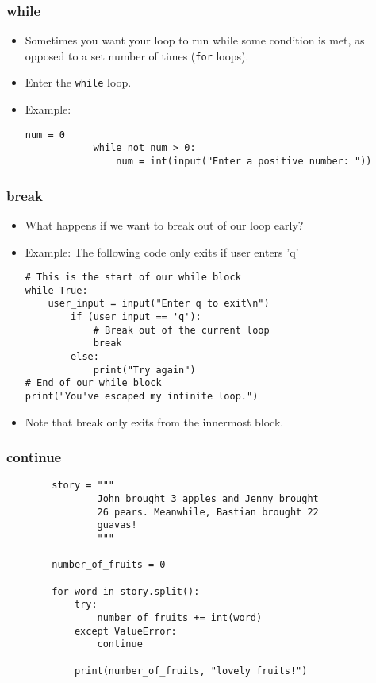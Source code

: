 \documentclass[notes]{beamer}
\begin{document}
	\begin{frame}[fragile]
		\frametitle{while}
		\begin{itemize}
			\item Sometimes you want your loop to run while some condition is met, as opposed to a set number of times (\lstinline|for| loops).
			\item Enter the \lstinline|while| loop.
			\pause
			\item Example:
			\begin{lstlisting}[xleftmargin=\dimexpr-\leftmargini, basicstyle=\scriptsize\tt]
			num = 0
			while not num > 0:
			    num = int(input("Enter a positive number: "))
			\end{lstlisting}

		\end{itemize}
	\end{frame}
	
	\begin{frame}[fragile]
		\frametitle{break}
		\begin{itemize}
			\item What happens if we want to break out of our loop early?
			\item Example:
			The following code only exits if user enters 'q'
			\begin{lstlisting}[xleftmargin=\dimexpr-\leftmargini, basicstyle=\scriptsize\tt]
# This is the start of our while block
while True:
    user_input = input("Enter q to exit\n")
        if (user_input == 'q'):
            # Break out of the current loop
            break
        else:
            print("Try again")
# End of our while block
print("You've escaped my infinite loop.")
			\end{lstlisting}
			\pause
			\item Note that break only exits from the innermost block.

		\end{itemize}
	\end{frame}
	
	\begin{frame}[fragile]
		\frametitle{continue}
		\begin{lstlisting}
		story = """
		        John brought 3 apples and Jenny brought
		        26 pears. Meanwhile, Bastian brought 22
		        guavas!
		        """

		number_of_fruits = 0
		
		for word in story.split():
		    try:
		        number_of_fruits += int(word)
		    except ValueError:
		        continue
		
		    print(number_of_fruits, "lovely fruits!")
		\end{lstlisting}
	\end{frame}
	
\end{document}
